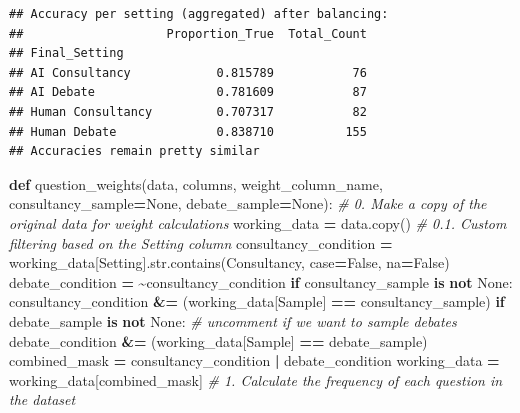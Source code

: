 \documentclass[
]{article}
\newenvironment{Shaded}{\begin{snugshade}}{\end{snugshade}}
\newcommand{\BuiltInTok}[1]{#1}
\newcommand{\CommentTok}[1]{\textcolor[rgb]{0.56,0.35,0.01}{\textit{#1}}}
\newcommand{\ControlFlowTok}[1]{\textcolor[rgb]{0.13,0.29,0.53}{\textbf{#1}}}
\newcommand{\KeywordTok}[1]{\textcolor[rgb]{0.13,0.29,0.53}{\textbf{#1}}}
\newcommand{\NormalTok}[1]{#1}
\newcommand{\OperatorTok}[1]{\textcolor[rgb]{0.81,0.36,0.00}{\textbf{#1}}}
\newcommand{\StringTok}[1]{\textcolor[rgb]{0.31,0.60,0.02}{#1}}
\newcommand{\VariableTok}[1]{\textcolor[rgb]{0.00,0.00,0.00}{#1}}
\begin{document}
\begin{verbatim}
## Accuracy per setting (aggregated) after balancing:
##                    Proportion_True  Total_Count
## Final_Setting                                  
## AI Consultancy            0.815789           76
## AI Debate                 0.781609           87
## Human Consultancy         0.707317           82
## Human Debate              0.838710          155
## Accuracies remain pretty similar
\end{verbatim}

\begin{Shaded}
\begin{Highlighting}[]


\KeywordTok{def}\NormalTok{ question\_weights(data, columns, weight\_column\_name, consultancy\_sample}\OperatorTok{=}\VariableTok{None}\NormalTok{, debate\_sample}\OperatorTok{=}\VariableTok{None}\NormalTok{):}
    \CommentTok{\# 0. Make a copy of the original data for weight calculations}
\NormalTok{    working\_data }\OperatorTok{=}\NormalTok{ data.copy()}
    \CommentTok{\# 0.1. Custom filtering based on the \textquotesingle{}Setting\textquotesingle{} column}
\NormalTok{    consultancy\_condition }\OperatorTok{=}\NormalTok{ working\_data[}\StringTok{\textquotesingle{}Setting\textquotesingle{}}\NormalTok{].}\BuiltInTok{str}\NormalTok{.contains(}\StringTok{\textquotesingle{}Consultancy\textquotesingle{}}\NormalTok{, case}\OperatorTok{=}\VariableTok{False}\NormalTok{, na}\OperatorTok{=}\VariableTok{False}\NormalTok{)}
\NormalTok{    debate\_condition }\OperatorTok{=} \OperatorTok{\textasciitilde{}}\NormalTok{consultancy\_condition}
    \ControlFlowTok{if}\NormalTok{ consultancy\_sample }\KeywordTok{is} \KeywordTok{not} \VariableTok{None}\NormalTok{:}
\NormalTok{        consultancy\_condition }\OperatorTok{\&=}\NormalTok{ (working\_data[}\StringTok{\textquotesingle{}Sample\textquotesingle{}}\NormalTok{] }\OperatorTok{==}\NormalTok{ consultancy\_sample)}
    \ControlFlowTok{if}\NormalTok{ debate\_sample }\KeywordTok{is} \KeywordTok{not} \VariableTok{None}\NormalTok{: }\CommentTok{\# uncomment if we want to sample debates}
\NormalTok{        debate\_condition }\OperatorTok{\&=}\NormalTok{ (working\_data[}\StringTok{\textquotesingle{}Sample\textquotesingle{}}\NormalTok{] }\OperatorTok{==}\NormalTok{ debate\_sample)}
\NormalTok{    combined\_mask }\OperatorTok{=}\NormalTok{ consultancy\_condition }\OperatorTok{|}\NormalTok{ debate\_condition}
\NormalTok{    working\_data }\OperatorTok{=}\NormalTok{ working\_data[combined\_mask]}
    \CommentTok{\# 1. Calculate the frequency of each question in the dataset}

\end{Highlighting}
\end{Shaded}
\end{document}
